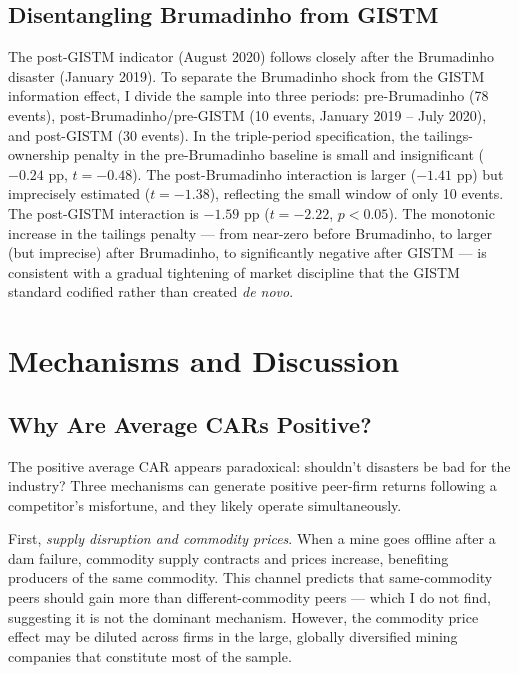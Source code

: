 \documentclass[12pt]{article}
\begin{document}
\subsection{Disentangling Brumadinho from GISTM}

The post-GISTM indicator (August 2020) follows closely after the Brumadinho disaster (January 2019). To separate the Brumadinho shock from the GISTM information effect, I divide the sample into three periods: pre-Brumadinho (78 events), post-Brumadinho/pre-GISTM (10 events, January 2019 -- July 2020), and post-GISTM (30 events). In the triple-period specification, the tailings-ownership penalty in the pre-Brumadinho baseline is small and insignificant ($-0.24$ pp, $t=-0.48$). The post-Brumadinho interaction is larger ($-1.41$ pp) but imprecisely estimated ($t=-1.38$), reflecting the small window of only 10 events. The post-GISTM interaction is $-1.59$ pp ($t=-2.22$, $p<0.05$). The monotonic increase in the tailings penalty --- from near-zero before Brumadinho, to larger (but imprecise) after Brumadinho, to significantly negative after GISTM --- is consistent with a gradual tightening of market discipline that the GISTM standard codified rather than created \emph{de novo}.

\section{Mechanisms and Discussion}\label{sec:mechanisms}

\subsection{Why Are Average CARs Positive?}

The positive average CAR appears paradoxical: shouldn't disasters be bad for the industry? Three mechanisms can generate positive peer-firm returns following a competitor's misfortune, and they likely operate simultaneously.

First, \emph{supply disruption and commodity prices}. When a mine goes offline after a dam failure, commodity supply contracts and prices increase, benefiting producers of the same commodity. This channel predicts that same-commodity peers should gain more than different-commodity peers --- which I do not find, suggesting it is not the dominant mechanism. However, the commodity price effect may be diluted across firms in the large, globally diversified mining companies that constitute most of the sample.
\end{document}
